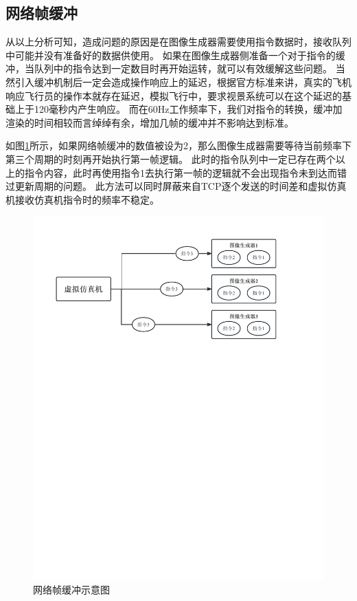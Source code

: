 \subsection{网络帧缓冲}
从以上分析可知，造成问题的原因是在图像生成器需要使用指令数据时，接收队列中可能并没有准备好的数据供使用。
如果在图像生成器侧准备一个对于指令的缓冲，当队列中的指令达到一定数目时再开始运转，就可以有效缓解这些问题。
当然引入缓冲机制后一定会造成操作响应上的延迟，根据官方标准来讲，真实的飞机响应飞行员的操作本就存在延迟，模拟飞行中，要求视景系统可以在这个延迟的基础上于120毫秒内产生响应。
而在60Hz工作频率下，我们对指令的转换，缓冲加渲染的时间相较而言绰绰有余，增加几帧的缓冲并不影响达到标准。
\clearpage
\par
如图\ref{framebuffer}所示，如果网络帧缓冲的数值被设为2，那么图像生成器需要等待当前频率下第三个周期的时刻再开始执行第一帧逻辑。
此时的指令队列中一定已存在两个以上的指令内容，此时再使用指令1去执行第一帧的逻辑就不会出现指令未到达而错过更新周期的问题。
此方法可以同时屏蔽来自TCP逐个发送的时间差和虚拟仿真机接收仿真机指令时的频率不稳定。
\begin{figure}[h!]
    \begin{center}
        \includegraphics[width=\textwidth]{pictures/framebuffer.pdf}
        \caption{网络帧缓冲示意图}
        \label{framebuffer}
    \end{center}
\end{figure}
